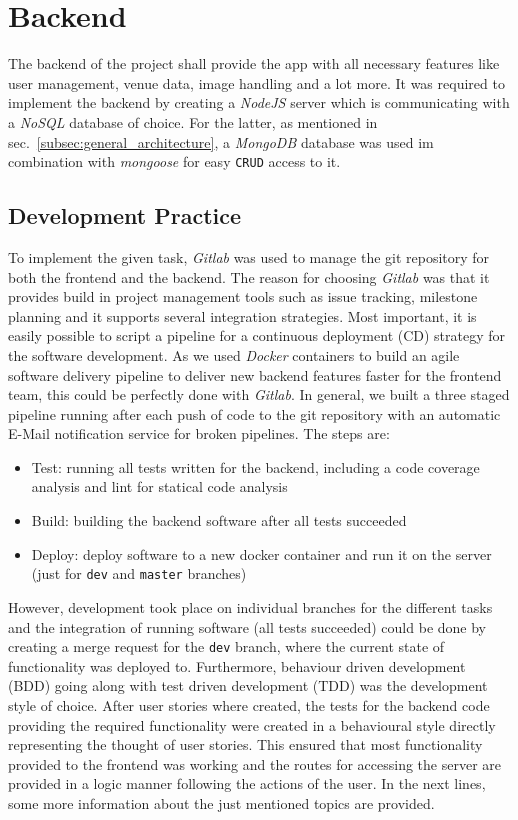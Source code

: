 \section{Backend}
\label{sec:backend}
The backend of the project shall provide the app with all necessary features like user management, venue data, image handling and a lot more. It was required to implement the backend by creating a \textit{NodeJS} server which is communicating with a \textit{NoSQL} database of choice. For the latter, as mentioned in sec.\ \ref{subsec:general_architecture}, a \textit{MongoDB} database was used im combination with \textit{mongoose} for easy \texttt{CRUD} access to it. 

\subsection{Development Practice}
\label{subsec:developmentpractice}
To implement the given task, \textit{Gitlab} was used to manage the git repository for both the frontend and the backend. The reason for choosing \textit{Gitlab} was that it provides build in project management tools such as issue tracking, milestone planning and it supports several integration strategies. Most important, it is easily possible to script a pipeline for a continuous deployment (CD) strategy for the software development. As we used \textit{Docker} containers to build an agile software delivery pipeline to deliver new backend features faster for the frontend team, this could be perfectly done with \textit{Gitlab}. \newline
In general, we built a three staged pipeline running after each push of code to the git repository with an automatic E-Mail notification service for broken pipelines. The steps are:
\begin{itemize}
	\item Test: running all tests written for the backend, including a code coverage analysis and lint for statical code analysis
	\item Build: building the backend software after all tests succeeded
	\item Deploy: deploy software to a new docker container and run it on the server (just for \texttt{dev} and \texttt{master} branches)
\end{itemize} 
However, development took place on individual branches for the different tasks and the integration of running software (all tests succeeded) could be done by creating a merge request for the \texttt{dev} branch, where the current state of functionality was deployed to. \newline\newline
Furthermore, behaviour driven development (BDD) going along with test driven development (TDD) was the development style of choice. After user stories where created, the tests for the backend code providing the required functionality were created in a behavioural style directly representing the thought of user stories. This ensured that most functionality provided to the frontend was working and the routes for accessing the server are provided in a logic manner following the actions of the user. In the next lines, some more information about the just mentioned topics are provided.

